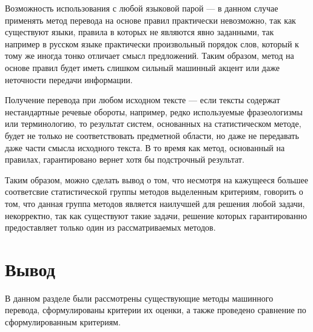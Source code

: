 Возможность использования с любой языковой парой --- в данном случае применять метод перевода на основе правил практически невозможно, так как существуют языки, правила в которых не являются явно заданными, так например в русском языке практически произвольный порядок слов, который к тому же иногда тонко отличает смысл предложений. Таким образом, метод на основе правил будет иметь слишком сильный машинный акцент или даже неточности передачи информации. 
    
Получение перевода при любом исходном тексте --- если тексты содержат нестандартные речевые обороты, например, редко используемые фразеологизмы или терминологию, то результат систем, основанных на статистическом методе, будет не только не соответствовать предметной области, но даже не передавать даже части смысла исходного текста. В то время как метод, основанный на правилах, гарантировано вернет хотя бы подстрочный результат. 

Таким образом, можно сделать вывод о том, что несмотря на кажущееся большее соответсвие статистической группы методов выделенным критериям, говорить о том, что данная группа методов является наилучшей для решения любой задачи, некорректно, так как существуют такие задачи, решение которых гарантированно предоставляет только один из рассматриваемых методов.

\section *{Вывод}

В данном разделе были рассмотрены существующие методы машинного перевода, сформулированы критерии их оценки, а также проведено сравнение по сформулированным критериям.
